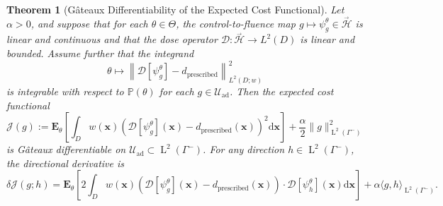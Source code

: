 \documentclass{amsart}
\newcommand{\dd}{{\mathrm d}}
\theoremstyle{plain}
\newtheorem{theorem}{Theorem}[section]
\renewcommand{\vec}[1]{\ensuremath{\boldsymbol{#1}}}
\newcommand{\leb}{\text{Leb}}
\newcommand{\LL}{\ensuremath{\operatorname L}\xspace}
\renewcommand{\leb}[1]{\ensuremath{\LL^{#1}}}
\newcommand{\cH}{\stackrel{_\rightarrow}{\mathscr H}}
\begin{document}
\begin{theorem}[Gâteaux Differentiability of the Expected Cost Functional]
  Let $\alpha > 0$, and suppose that for each $\theta \in \Theta$, the
  control-to-fluence map $g \mapsto \psi_g^\theta \in \cH$ is linear
  and continuous and that the dose operator $\mathcal{D}: \cH \to
  L^2(D)$ is linear and bounded. Assume further that the integrand
  \begin{equation}
    \theta \mapsto \left\| \mathcal{D}[\psi_g^\theta] - d_{\text{prescribed}} \right\|_{L^2(D; w)}^2
  \end{equation}
  is integrable with respect to $\mathbb{P}(\theta)$ for each $g \in
  \mathcal{U}_{\mathrm{ad}}$. Then the expected cost functional
  \begin{equation}
    \mathcal{J}(g) := \mathbf{E}_\theta \left[ \int_D w(\vec{x}) \left( \mathcal{D}[\psi_g^\theta](\vec{x}) - d_{\text{prescribed}}(\vec{x}) \right)^2 \dd \vec{x} \right] + \frac{\alpha}{2} \| g \|^2_{\leb2(\Gamma^-)}
  \end{equation}
  is Gâteaux differentiable on $\mathcal{U}_{\mathrm{ad}} \subset
  \leb2(\Gamma^-)$. For any direction $h \in \leb2(\Gamma^-)$, the
  directional derivative is
  \begin{equation}
    \delta \mathcal{J}(g; h) =
    \mathbf{E}_\theta \left[ 2 \int_D w(\vec{x}) \left( \mathcal{D}[\psi_g^\theta](\vec{x}) - d_{\text{prescribed}}(\vec{x}) \right) \cdot \mathcal{D}[\psi_h^\theta](\vec{x}) \dd \vec{x} \right]
    + \alpha \langle g, h \rangle_{\leb2(\Gamma^-)}.
  \end{equation}
\end{theorem}
\end{document}
